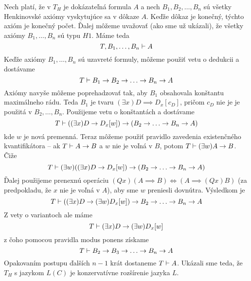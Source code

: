 \begin{dokaz}
    Nech platí, že v $T_H$ je dokázateľná formula $A$
    a nech $B_1, B_2, \ldots ,B_n$ sú všetky Henkinovské
    axiómy vyskytujúce sa v dôkaze $A$. Keďže dôkaz je konečný, týchto
    axióm je konečný počet. Ďalej môžeme uvažovať (ako sme už ukázali),
    že všetky axiómy $B_1, \ldots, B_n$ sú typu $H1$.
    Máme teda
    \begin{equation*}
        T, B_1, \dots ,B_n \vdash A
    \end{equation*}
    Keďže axiómy $B_1,\ldots,B_n$ sú uzavreté formuly, môžeme použiť vetu o dedukcii
    a dostávame
    \begin{equation*}
        T \vdash B_1 \rightarrow B_2 \rightarrow \ldots \rightarrow B_n \rightarrow A
    \end{equation*}
    Axiómy navyše môžeme poprehadzovať tak, aby $B_1$ obsahovala konštantu maximálneho rádu.
    Teda $B_1$ je tvaru $(\exists x) D \implies D_x[c_D]$, pričom $c_D$ nie je je použitá
    v $B_2, \ldots, B_n$. Použijeme vetu o konštantách a dostávame
    \begin{equation*}
        T \vdash ((\exists x) D \rightarrow D_x[w] ) \rightarrow (B_2 \rightarrow \ldots \rightarrow B_n \rightarrow A)
    \end{equation*}
    kde $w$ je nová premenná.
    Teraz môžeme použiť pravidlo zavedenia existenčného kvantifikátora --
    ak $T \vdash A \rightarrow B$ a $w$ nie je voľná v $B$, potom $T\vdash (\exists w) A \rightarrow B$.
    Čiže
    \begin{equation*}
        T \vdash (\exists w) ((\exists x)D \rightarrow D_x[w]) \rightarrow (B_2 \rightarrow
            \ldots \rightarrow B_n \rightarrow A)
    \end{equation*}
    Ďalej použijeme prenexnú operáciu $(Qx) (A\implies B) \iff (A\implies
    (Qx)B)$ (za predpokladu, že $x$ nie je voľná v $A$), aby sme $w$
    preniesli dovnútra. Výsledkom je
    \begin{equation*}
        T \vdash ((\exists x) D \rightarrow (\exists w)D_x[w]) \rightarrow B_2 \rightarrow \ldots \rightarrow B_n \rightarrow A
    \end{equation*}
    Z vety o variantoch ale máme
    \begin{equation*}
        T \vdash ( \exists x ) D \rightarrow (\exists w) D_x[w] \\
    \end{equation*}
    z čoho pomocou pravidla modus ponens získame
    \begin{equation*}
        T \vdash B_2 \rightarrow B_3 \rightarrow \ldots \rightarrow B_n \rightarrow A
    \end{equation*}
    Opakovaním postupu ďalších $n-1$ krát dostaneme $T \vdash A$.
    Ukázali sme teda, že $T_H$ s jazykom $L(C)$ je konzervatívne rozšírenie jazyka $L$.
\end{dokaz}

